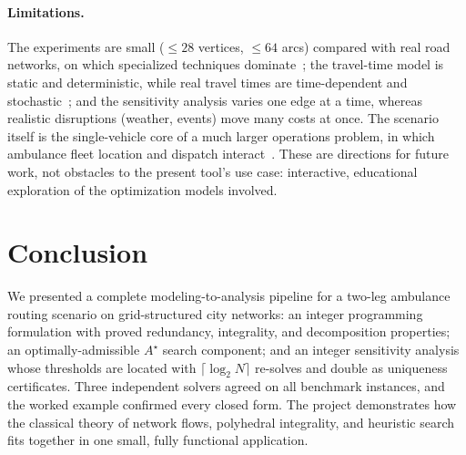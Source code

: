 \documentclass[10pt,twocolumn]{article}
\begin{document}
\paragraph{Limitations.}
The experiments are small ($\le 28$ vertices, $\le 64$ arcs) compared with real road
networks, on which specialized techniques dominate~\cite{goldbergharrelson05}; the
travel-time model is static and deterministic, while real travel times are time-dependent
and stochastic~\cite{ordarom90}; and the sensitivity analysis varies one edge at a time,
whereas realistic disruptions (weather, events) move many costs at once. The scenario
itself is the single-vehicle core of a much larger operations problem, in which ambulance
fleet location and dispatch interact~\cite{larson74,brotcorne03,gendreau01}. These are
directions for future work, not obstacles to the present tool's use case: interactive,
educational exploration of the optimization models involved.

\section{Conclusion}
\label{sec:conclusion}

We presented a complete modeling-to-analysis pipeline for a two-leg ambulance routing
scenario on grid-structured city networks: an integer programming formulation with proved
redundancy, integrality, and decomposition properties; an optimally-admissible $A^{\star}$ search
component; and an integer sensitivity analysis whose thresholds are located with
$\lceil\log_2 N\rceil$ re-solves and double as uniqueness certificates. Three independent
solvers agreed on all benchmark instances, and the worked example confirmed every closed
form. The project demonstrates how the classical theory of network flows, polyhedral
integrality, and heuristic search fits together in one small, fully functional application.



\end{document}
